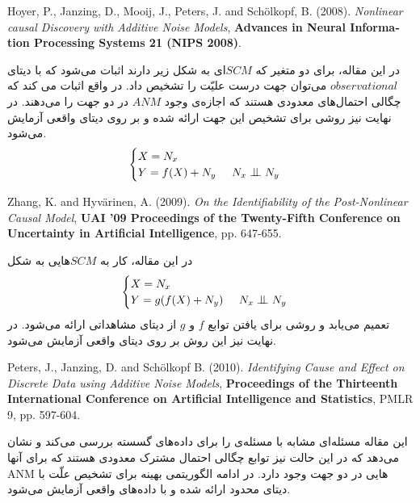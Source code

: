 \documentclass{article}
\begin{document}
\begin{enumerate}
	
\begin{latin}
Hoyer, P., Janzing, D., Mooij, J., Peters, J. and Sch{\"o}lkopf, B.  (2008).
\textit{Nonlinear causal Discovery with Additive Noise Models}, \textbf{Advances  in  Neural  Information  Processing  Systems 21 (NIPS 2008)}.
\end{latin}
در این مقاله، برای دو متغیر که $SCM$ای به شکل زیر دارند اثبات می‌شود که با دیتای $observational$ می‌توان جهت درست علیّت را تشخیص داد. در واقع اثبات می کند که چگالی احتمال‌های معدودی هستند که اجازه‌ی وجود  $ANM$ در دو جهت را می‌دهند. در نهایت نیز روشی برای تشخیص این جهت ارائه شده و بر روی دیتای واقعی آزمایش می‌شود.
\begin{equation}
\begin{cases}
X = N_x \\
Y = f(X) + N_y \;\;\;\;\; N_x \bigCI N_y
\end{cases}
\end{equation}

\begin{latin}
\item Zhang, K. and Hyvärinen, A. (2009). 
\textit{On the Identifiability of the Post-Nonlinear Causal Model}, \textbf{}
\textbf{UAI '09 Proceedings of the Twenty-Fifth Conference on Uncertainty in Artificial Intelligence}, pp. 647-655.
\end{latin}
در این مقاله، کار
به $SCM$هایی به شکل 
\begin{equation}
\begin{cases}
X = N_x \\
Y = g(f(X) + N_y) \;\;\;\;\; N_x \bigCI N_y
\end{cases}
\end{equation}
تعمیم می‌یابد و روشی برای یافتن توابع $f$ و $g$ از دیتای مشاهداتی ارائه می‌شود. در نهایت نیز این روش بر روی دیتای واقعی آزمایش می‌شود.

\begin{latin}
\item Peters, J., Janzing, D. and Sch{\"o}lkopf B. (2010).
\textit{Identifying Cause and Effect on Discrete Data using Additive Noise Models}, 
\textbf{Proceedings of the Thirteenth International Conference on Artificial Intelligence and Statistics}, PMLR 9, pp. 597-604.
\end{latin}
این مقاله مسئله‌ای مشابه با مسئله‌ی 
را برای داده‌های گسسته بررسی می‌کند و نشان می‌دهد که در این حالت نیز توابع چگالی احتمال مشترک معدودی هستند که برای آنها ANM هایی در دو جهت وجود دارد. در ادامه الگوریتمی بهینه برای تشخیص علّت با دیتای محدود ارائه شده و با  داده‌های واقعی آزمایش می‌شود.


\end{enumerate}
\end{document}
